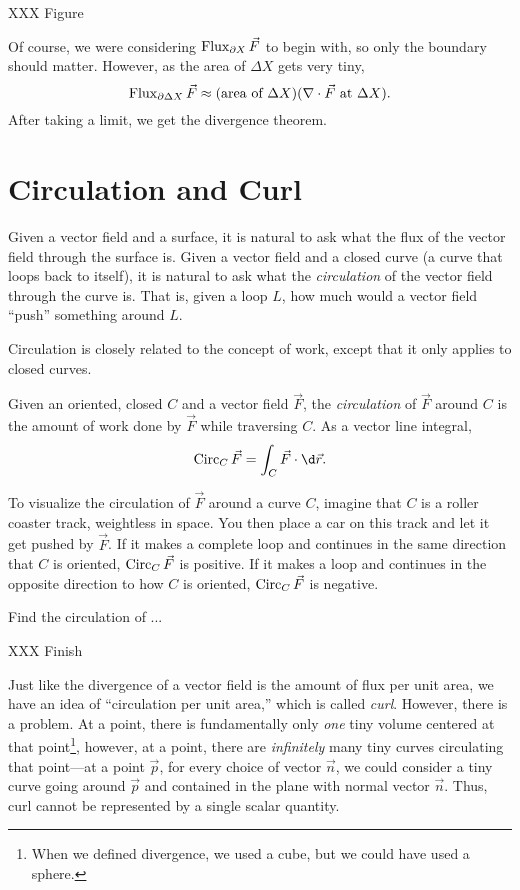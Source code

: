 XXX Figure

Of course, we were considering $\operatorname{Flux}_{\partial X}\vec F$ to begin with,
so only the boundary should matter.  However, as the area of $\Delta X$ gets very tiny,
\[
	\operatorname{Flux}_{\partial \Delta X} \vec F \approx (\text{area of }\Delta X)(\nabla \cdot \vec F
	\text{ at }\Delta X).
\]
After taking a limit, we get the divergence theorem.


\section{Circulation and Curl}

Given a vector field and a surface, it is natural
to ask what the flux of the vector field through the surface is.
Given a vector field and a closed curve (a curve that loops back
to itself), it is natural to ask what the \emph{circulation}
of the vector field through the curve is.  That is, given a loop $L$,
how much would a vector field ``push'' something around $L$.

Circulation is closely related to the concept of work, except that
it only applies to closed curves.

\begin{definition}[Circulation]
	Given an oriented, closed $C$ and a vector field $\vec F$, the 
	\emph{circulation} of $\vec F$ around $C$ is the amount
	of work done by $\vec F$ while traversing $C$.  As a
	vector line integral,
	\[
		\Circ_C\vec F = \int_C \vec F \cdot \d \vec r.
	\]
\end{definition}

To visualize the circulation of $\vec F$ around a curve $C$, imagine that
$C$ is a roller coaster track, weightless in space.  You then place a car on
this track and let it get pushed by $\vec F$.  If it makes a complete loop and
continues in the same direction that $C$ is oriented, $\operatorname{Circ}_C\vec F$ is positive.
If it makes a loop and continues in the opposite direction to how $C$ is 
oriented, $\operatorname{Circ}_C \vec F$ is negative.

\begin{example}
	Find the circulation of ...

	XXX Finish
\end{example}

Just like the divergence of a vector field is the amount of flux per unit area,
we have an idea of ``circulation per unit area,'' which is called \emph{curl}.
However, there is a problem.
At a point, there is fundamentally only \emph{one} tiny volume centered at that
point\footnote{ When we defined divergence, we used a cube, but we could have used
a sphere.}, however, at a point, there are \emph{infinitely} many tiny curves 
circulating that point---at a point $\vec p$,
for every choice of vector $\vec n$, we could consider a tiny curve going around 
$\vec p$ and contained in the plane with normal vector $\vec n$.  
Thus, curl cannot be represented by a single scalar quantity.


